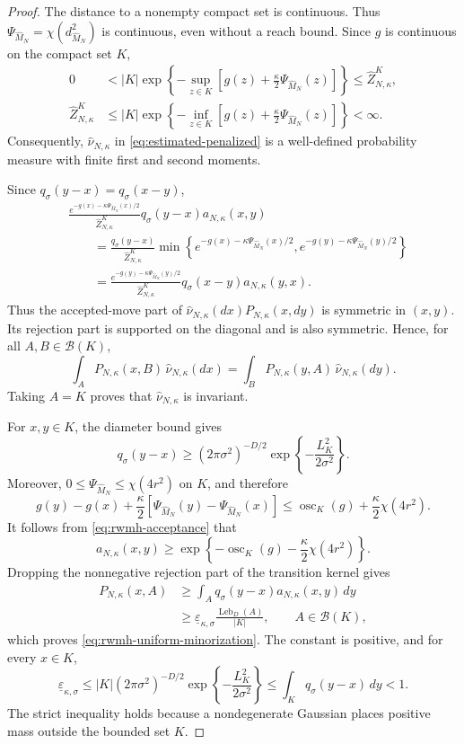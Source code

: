 \documentclass{article}
\newcommand{\osc}{\operatorname{osc}}
\newcommand{\Leb}{\operatorname{Leb}}
\newcommand{\wideM}{\widehat M_N}
\newcommand{\whatnu}{\widehat\nu_{N,\kappa}}
\numberwithin{equation}{section}
\begin{document}
\begin{proof}
The distance to a nonempty compact set is continuous. Thus
$\Psi_{\wideM}=\chi(d_{\wideM}^2)$ is continuous, even without a
reach bound. Since $g$ is continuous on the compact set $K$,
\begin{align*}
 0
 &<
 |K|\exp\left\{
 -\sup_{z\in K}
 \left[g(z)+\frac{\kappa}{2}\Psi_{\wideM}(z)\right]
 \right\}
 \le \widehat Z_{N,\kappa}^{K},\\
 \widehat Z_{N,\kappa}^{K}
 &\le
 |K|\exp\left\{
 -\inf_{z\in K}
 \left[g(z)+\frac{\kappa}{2}\Psi_{\wideM}(z)\right]
 \right\}
 <\infty.
\end{align*}
Consequently, $\whatnu$ in \eqref{eq:estimated-penalized} is a
well-defined probability measure with finite first and second moments.

Since $q_\sigma(y-x)=q_\sigma(x-y)$,
\begin{align*}
 &\frac{
 e^{-g(x)-\kappa\Psi_{\wideM}(x)/2}}
 {\widehat Z_{N,\kappa}^{K}}
 q_\sigma(y-x)a_{N,\kappa}(x,y)\\
 &\qquad=
 \frac{q_\sigma(y-x)}{\widehat Z_{N,\kappa}^{K}}
 \min\left\{
 e^{-g(x)-\kappa\Psi_{\wideM}(x)/2},
 e^{-g(y)-\kappa\Psi_{\wideM}(y)/2}
 \right\}\\
 &\qquad=
 \frac{
 e^{-g(y)-\kappa\Psi_{\wideM}(y)/2}}
 {\widehat Z_{N,\kappa}^{K}}
 q_\sigma(x-y)a_{N,\kappa}(y,x).
\end{align*}
Thus the accepted-move part of
$\whatnu(dx)P_{N,\kappa}(x,dy)$ is symmetric in $(x,y)$. Its rejection
part is supported on the diagonal and is also symmetric. 
Hence, for
all $A,B\in\mathcal B(K)$,
\[
 \int_A P_{N,\kappa}(x,B)\,\whatnu(dx)
 =
 \int_B P_{N,\kappa}(y,A)\,\whatnu(dy).
\]
Taking $A=K$ proves that $\whatnu$ is invariant.

For $x,y\in K$, the diameter bound gives
\[
 q_\sigma(y-x)
 \ge(2\pi\sigma^2)^{-D/2}
     \exp\left\{-\frac{L_K^2}{2\sigma^2}\right\}.
\]
Moreover, $0\le\Psi_{\wideM}\le\chi(4r^2)$ on $K$, and therefore
\[
 g(y)-g(x)
 +\frac{\kappa}{2}
 \left[\Psi_{\wideM}(y)-\Psi_{\wideM}(x)\right]
 \le
 \osc_K(g)+\frac{\kappa}{2}\chi(4r^2).
\]
It follows from \eqref{eq:rwmh-acceptance} that
\[
 a_{N,\kappa}(x,y)
 \ge
 \exp\left\{
 -\osc_K(g)-\frac{\kappa}{2}\chi(4r^2)
 \right\}.
\]
Dropping the nonnegative rejection part of the transition kernel gives
\begin{align*}
 P_{N,\kappa}(x,A)
 &\ge\int_Aq_\sigma(y-x)a_{N,\kappa}(x,y)\,dy\\
 &\ge
 \underline\varepsilon_{\kappa,\sigma}
 \frac{\Leb_D(A)}{|K|},
 \qquad A\in\mathcal B(K),
\end{align*}
which proves \eqref{eq:rwmh-uniform-minorization}. The constant is
positive, and for every $x\in K$,
\[
 \underline\varepsilon_{\kappa,\sigma}
 \le
 |K|(2\pi\sigma^2)^{-D/2}
 \exp\left\{-\frac{L_K^2}{2\sigma^2}\right\}
 \le\int_Kq_\sigma(y-x)\,dy<1.
\]
The strict inequality holds because a nondegenerate Gaussian places
positive mass outside the bounded set $K$.


\end{proof}
\end{document}
